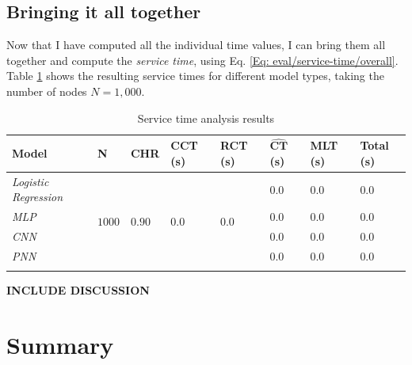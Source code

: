 			\subsection{Bringing it all together} \label{Section: eval/service-time/together}
			Now that I have computed all the individual time values, I can bring them all together and compute the \textit{service time}, using Eq. \ref{Eq: eval/service-time/overall}. Table \ref{Table: eval/service-time/together/overall} shows the resulting service times for different model types, taking the number of nodes $N=1,000$.
			\begin{longtable}{|p{}||p{.1\textwidth}|p{}|p{}|p{}|p{}|p{}||p{}|}
				\textbf{Model} & \textbf{N} & \textbf{CHR} & \textbf{CCT} (s)  & \textbf{RCT} (s)& $\mathbf{\hat{CT}}$ (s)& \textbf{MLT} (s)& \textbf{Total} (s)\\
				\hline
				\textit{Logistic Regression} & \multirow{5}{*}{$1000$} & \multirow{5}{*}{$0.90$} & \multirow{5}{*}{$0.0$} & \multirow{5}{*}{$0.0$} & $0.0$ & $0.0$ & \cellcolor{green!20} $\mathbf{0.0}$ \\
				\hhline{-~~~~---}
				\textit{MLP} &  &  &  &  & $0.0$ & $0.0$ &\cellcolor{green!20} $\mathbf{0.0}$  \\
				\hhline{-~~~~---}
				\textit{CNN} &  &  &  &  & $0.0$ & $0.0$ & \cellcolor{green!20} $\mathbf{0.0}$ \\
				\hhline{-~~~~---}
				\hhline{-~~~~---}
				\textit{PNN} &  &  &  &  & $0.0$ & $0.0$ & \cellcolor{green!20} $\mathbf{0.0}$ \\
				\hline
				\caption{Service time analysis results}
				\label{Table: eval/service-time/together/overall}
			\end{longtable}
			{\LARGE \textbf{INCLUDE DISCUSSION}}
		\section{Summary} \label{Section: eval/summary}
